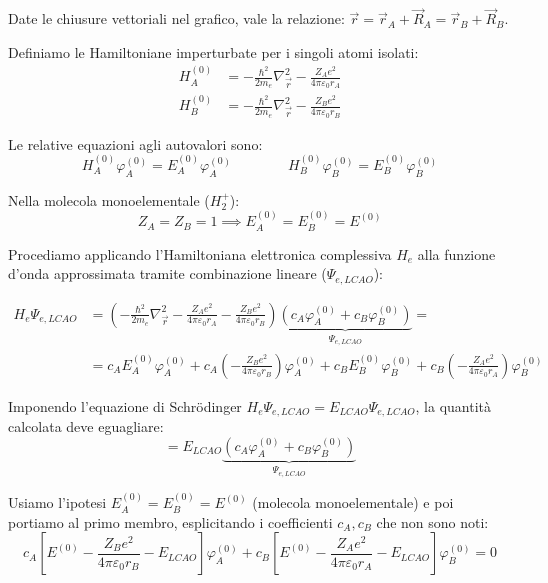 \begin{remark}
    Date le chiusure vettoriali nel grafico, vale la relazione: \( \vec{r} = \vec{r}_A + \vec{R}_A = \vec{r}_B + \vec{R}_B \).
\end{remark}

Definiamo le Hamiltoniane imperturbate per i singoli atomi isolati:
\begin{align}
    H_A^{(0)} &= -\frac{\hbar^2}{2m_e} \nabla_{\vec{r}}^2 - \frac{Z_A e^2}{4\pi\varepsilon_0 r_A} \\[1.5ex]
    H_B^{(0)} &= -\frac{\hbar^2}{2m_e} \nabla_{\vec{r}}^2 - \frac{Z_B e^2}{4\pi\varepsilon_0 r_B}
\end{align}

Le relative equazioni agli autovalori sono:
\begin{equation}
    H_A^{(0)} \varphi_A^{(0)} = E_A^{(0)} \varphi_A^{(0)} \qquad \qquad H_B^{(0)} \varphi_B^{(0)} = E_B^{(0)} \varphi_B^{(0)}
\end{equation}

Nella molecola monoelementale (\( H_2^+ \)):
\begin{equation}
    Z_A = Z_B = 1 \implies E_A^{(0)} = E_B^{(0)} = E^{(0)}
\end{equation}

Procediamo applicando l'Hamiltoniana elettronica complessiva \( H_e \) alla funzione d'onda approssimata tramite combinazione lineare (\( \Psi_{e,LCAO} \)):

\begin{align}
    H_e \Psi_{e,LCAO} &= \left( -\frac{\hbar^2}{2m_e} \nabla_{\vec{r}}^2 - \frac{Z_A e^2}{4\pi\varepsilon_0 r_A} - \frac{Z_B e^2}{4\pi\varepsilon_0 r_B} \right) \underbrace{\left( c_A \varphi_A^{(0)} + c_B \varphi_B^{(0)} \right)}_{\Psi_{e,LCAO}} = \nonumber \\[2ex]
    &= c_A E_A^{(0)} \varphi_A^{(0)} + c_A \left( -\frac{Z_B e^2}{4\pi\varepsilon_0 r_B} \right) \varphi_A^{(0)} + c_B E_B^{(0)} \varphi_B^{(0)} + c_B \left( -\frac{Z_A e^2}{4\pi\varepsilon_0 r_A} \right) \varphi_B^{(0)}
\end{align}

Imponendo l'equazione di Schrödinger \( H_e \Psi_{e,LCAO} = E_{LCAO} \Psi_{e,LCAO} \), la quantità calcolata deve eguagliare:
\begin{equation}
    = E_{LCAO} \underbrace{\left( c_A \varphi_A^{(0)} + c_B \varphi_B^{(0)} \right)}_{\Psi_{e,LCAO}}
\end{equation}

Usiamo l'ipotesi \( E_A^{(0)} = E_B^{(0)} = E^{(0)} \) (molecola monoelementale) e poi portiamo al primo membro, esplicitando i coefficienti \( c_A, c_B \) che non sono noti:
\begin{equation}
    c_A \left[ E^{(0)} - \frac{Z_B e^2}{4\pi\varepsilon_0 r_B} - E_{LCAO} \right] \varphi_A^{(0)} + c_B \left[ E^{(0)} - \frac{Z_A e^2}{4\pi\varepsilon_0 r_A} - E_{LCAO} \right] \varphi_B^{(0)} = 0
\end{equation}

